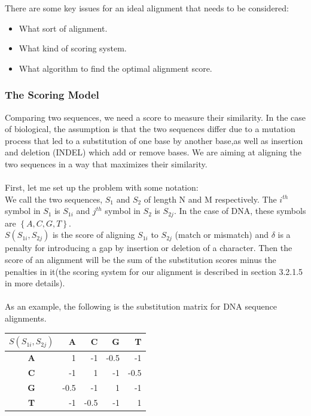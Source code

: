 \documentclass[11pt,a4paper]{report}
\begin{document}
There are some key issues for an ideal alignment that needs to be considered:

\begin{itemize} 
	\item  What sort of alignment.
	\item  What kind of scoring system.
	\item  What algorithm to find the optimal alignment score.
\end{itemize}


\subsubsection{The Scoring Model}

Comparing two sequences, we need a score to measure their similarity.
In the case of biological, the assumption is that the two sequences differ
due to a mutation process that led to a substitution 
of one base by another base,as well as insertion and deletion (INDEL) which add or remove bases.
We are aiming at aligning the two sequences in a way that maximizes their similarity.\\ \\
First, let me set up the problem with some notation:\\
We call the two sequences, $S_{1}$ and $S_{2}$ of length N and M respectively. 
The $i^{th}$ symbol in $S_{1}$ is $S_{1i}$ and $j^{th}$ symbol in $S_{2}$ is $S_{2j}$. 
In the case of DNA, these symbols are $\left\{A, C, G, T\right\}$.\\
$S(S_{1i}, S_{2j})$ is the score of aligning $S_{1i}$ to $S_{2j}$ (match or mismatch)
and $\delta$ is a penalty for introducing a gap by insertion or deletion of a character. 
Then the score of an alignment will be the sum of the substitution scores minus the 
penalties in it(the scoring system for our alignment is described in section 3.2.1.5 in more details).\\\\
As an example, the following is the substitution matrix for DNA sequence alignments.


\begin{table}[H]
 \centering
  \begin{tabular}{  c| r  r r  r }
    
  \textbf{  $S(S_{1i}, S_{2j})$ } & \textbf{A} &\textbf{ C} &\textbf{ G} &\textbf{ T} \\ \hline
       \textbf{A} &  1  & -1 & -0.5 & -1 \\
       \textbf{C} & -1  & 1 & -1 & -0.5 \\ 
       \textbf{G} & -0.5 & -1 & 1 & -1 \\ 
       \textbf{T} & -1 & -0.5 & -1 & 1
    \end{tabular}
\label{alignment-exp}
\end{table}
\end{document}
